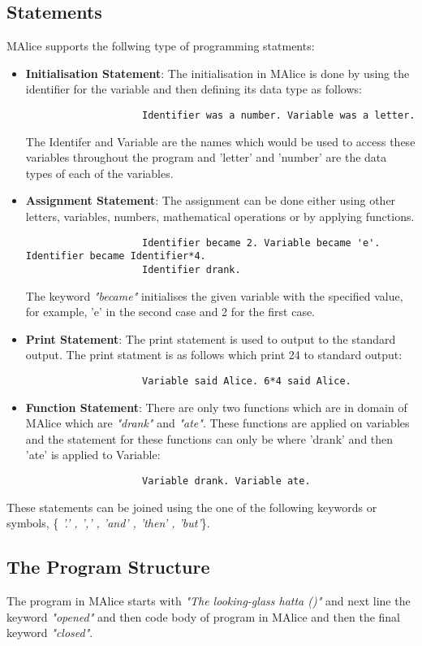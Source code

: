 \documentclass[a4wide, 11pt]{article}
\begin{document}
	\subsection{Statements}
	\label{sec:statements}
		MAlice supports the follwing type of programming statments:
		\begin{itemize}
			\item {\bf Initialisation Statement}: The initialisation in MAlice is done by using the identifier
		 		for the variable and then defining its data type as follows:
				\begin{verbatim}
					Identifier was a number. Variable was a letter.
				\end{verbatim}	
				The Identifer and Variable are the names which would be used to access these variables throughout
				the program and 'letter' and 'number' are the data types of each of the variables.
			\item {\bf Assignment Statement}: The assignment can be done either using other letters, variables, numbers,
				mathematical operations or by applying functions.
				\begin{verbatim}
					Identifier became 2. Variable became 'e'. Identifier became Identifier*4.
					Identifier drank.
				\end{verbatim}
				The keyword \emph{"became"} initialises the given variable with the specified value, for example,
				'e' in the second case and 2 for the first case.
			\item {\bf Print Statement}: The print statement is used to output to the standard output. The print
				statment is as follows which print 24 to standard output:
				\begin{verbatim}
					Variable said Alice. 6*4 said Alice.
				\end{verbatim}
			\item {\bf Function Statement}: There are only two functions which are in domain of MAlice which are
				\emph{"drank"} and \emph{"ate"}. These functions are applied on variables and the statement for these 
				functions can only be where 'drank' and then 'ate' is applied to Variable:
				\begin{verbatim}
					Variable drank. Variable ate.	
				\end{verbatim}
		\end{itemize}
		These statements can be joined using the one of the following keywords or symbols, \{ \emph{'.' , ',' , 'and' , 'then' , 'but'}\}.

	\subsection{The Program Structure}
	\label{sec:progStr}
		The program in MAlice starts with \emph{"The looking-glass hatta ()"} and next line the keyword \emph{"opened"}
		and then code body of program in MAlice and then the final keyword \emph{"closed"}.
\end{document}

